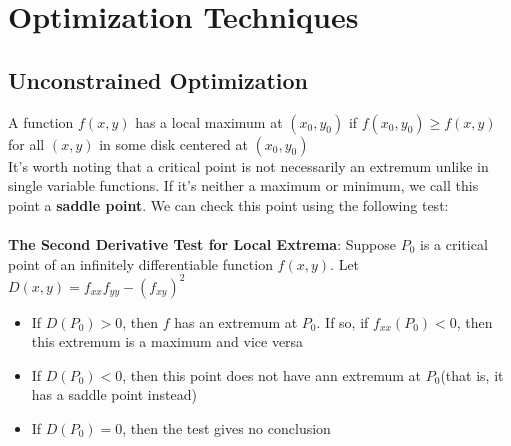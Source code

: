 \documentclass[12pt]{report}
\begin{document}
\chapter{Optimization Techniques}
	\section{Unconstrained Optimization}
		A function $f(x,y)$ has a local maximum at $(x_0, y_0)$ if $f(x_0, y_0) \geq f(x,y)$ for all $(x,y)$ in some disk centered at $(x_0, y_0)$
		\\
		It's worth noting that a critical point is not necessarily an extremum unlike in single variable functions. If it's neither a maximum or minimum, we call this point a \textbf{saddle point}. We can check this point using the following test:\\
		\\
		\textbf{The Second Derivative Test for Local Extrema}: Suppose $P_0$ is a critical point of an infinitely differentiable function $f(x,y)$. Let $D(x,y) = f_{xx}f_{yy} - (f_{xy})^2$
		\begin{itemize}
			\item If $D(P_0) > 0$, then $f$ has an extremum at $P_0$. If so, if $f_{xx}(P_0) < 0$, then this extremum is a maximum and vice versa
			\item If $D(P_0) < 0$, then this point does not have ann extremum at $P_0$(that is, it has a saddle point instead)
			\item If $D(P_0) = 0$, then the test gives no conclusion
		\end{itemize}
\end{document}
